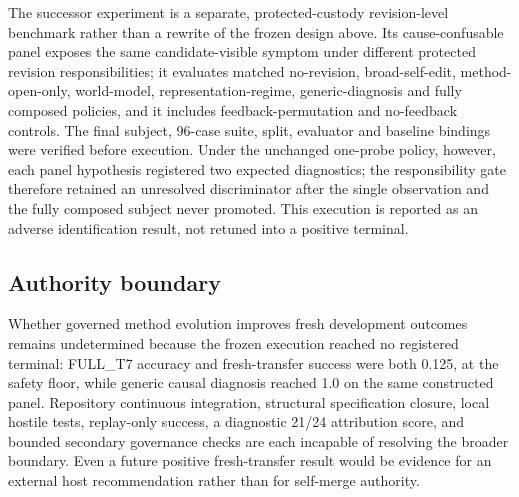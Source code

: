 The successor experiment is a separate, protected-custody revision-level benchmark rather than a rewrite of the frozen design above. Its cause-confusable panel exposes the same candidate-visible symptom under different protected revision responsibilities; it evaluates matched no-revision, broad-self-edit, method-open-only, world-model, representation-regime, generic-diagnosis and fully composed policies, and it includes feedback-permutation and no-feedback controls. The final subject, 96-case suite, split, evaluator and baseline bindings were verified before execution. Under the unchanged one-probe policy, however, each panel hypothesis registered two expected diagnostics; the responsibility gate therefore retained an unresolved discriminator after the single observation and the fully composed subject never promoted. This execution is reported as an adverse identification result, not retuned into a positive terminal.

\subsection{Authority boundary}

Whether governed method evolution improves fresh development outcomes remains undetermined because the frozen execution reached no registered terminal: FULL\_T7 accuracy and fresh-transfer success were both 0.125, at the safety floor, while generic causal diagnosis reached 1.0 on the same constructed panel. Repository continuous integration, structural specification closure, local hostile tests, replay-only success, a diagnostic 21/24 attribution score, and bounded secondary governance checks are each incapable of resolving the broader boundary. Even a future positive fresh-transfer result would be evidence for an external host recommendation rather than for self-merge authority.

